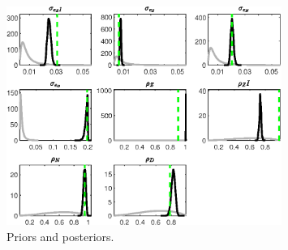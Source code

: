  
\begin{figure}[H]
\centering
\includegraphics[width=0.80\textwidth]{BRS/Output/BRS_PriorsAndPosteriors1}
\caption{Priors and posteriors.}\label{Fig:PriorsAndPosteriors:1}
\end{figure}
 
